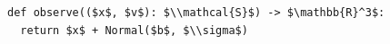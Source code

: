 \documentclass[border=10pt]{standalone}
\begin{document}
\begin{lstlisting}
def observe(($x$, $v$): $\\mathcal{S}$) -> $\mathbb{R}^3$:
  return $x$ + Normal($b$, $\\sigma$)
\end{lstlisting}
\end{document}
